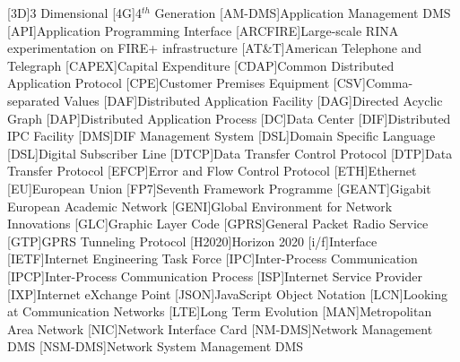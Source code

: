 \begin{acronym}[PRISTINE]
    [3D]{3 Dimensional}
    [4G]{4$^{th}$ Generation}
    [AM-DMS]{Application Management DMS}
    [API]{Application Programming Interface}
    [ARCFIRE]{Large-scale RINA experimentation on FIRE+ infrastructure}
    [AT\&T]{American Telephone and Telegraph}
    [CAPEX]{Capital Expenditure}
    [CDAP]{Common Distributed Application Protocol}
    [CPE]{Customer Premises Equipment}
    [CSV]{Comma-separated Values}
    [DAF]{Distributed Application Facility}
    [DAG]{Directed Acyclic Graph}
    [DAP]{Distributed Application Process}
    [DC]{Data Center}
    [DIF]{Distributed IPC Facility}
    [DMS]{DIF Management System}
    [DSL]{Domain Specific Language}
    [DSL]{Digital Subscriber Line}
    [DTCP]{Data Transfer Control Protocol}
    [DTP]{Data Transfer Protocol}
    [EFCP]{Error and Flow Control Protocol}
    [ETH]{Ethernet}
    [EU]{European Union}
    [FP7]{Seventh Framework Programme}
    [GEANT]{Gigabit European Academic Network}
    [GENI]{Global Environment for Network Innovations}
    [GLC]{Graphic Layer Code}
    [GPRS]{General Packet Radio Service}
    [GTP]{GPRS Tunneling Protocol}
    [H2020]{Horizon 2020}
    [i/f]{Interface}
    [IETF]{Internet Engineering Task Force}
    [IPC]{Inter-Process Communication}
    [IPCP]{Inter-Process Communication Process}
    [ISP]{Internet Service Provider}
    [IXP]{Internet eXchange Point}
    [JSON]{JavaScript Object Notation}
    [LCN]{Looking at Communication Networks}
    [LTE]{Long Term Evolution}
    [MAN]{Metropolitan Area Network}
    [NIC]{Network Interface Card}
    [NM-DMS]{Network Management DMS}
    [NSM-DMS]{Network System Management DMS}

\end{acronym}
